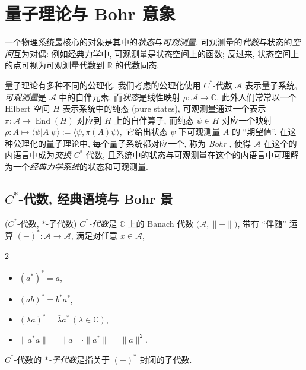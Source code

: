 \section{量子理论与 Bohr 意象}


一个物理系统最核心的对象是其中的\emph{状态}与\emph{可观测量}. 可观测量的\emph{代数}与状态的\emph{空间}互为对偶: 例如经典力学中, 可观测量是状态空间上的函数; 反过来, 状态空间上的点可视为可观测量代数到 $\mathbb{R}$ 的代数同态.

量子理论有多种不同的公理化, 我们考虑的公理化使用 $C^*$-代数 $\mathcal A$ 表示量子系统, \emph{可观测量}是 $\mathcal A$ 中的自伴元素, 而\emph{状态}是线性映射 $\rho\colon \mathcal A \to \mathbb{C}.$ 此外人们常常以一个 Hilbert 空间 $H$ 表示系统中的纯态 (pure states), 可观测量通过一个表示 $\pi\colon \mathcal A \to \operatorname{End}(H)$ 对应到 $H$ 上的自伴算子, 而纯态 $\psi\in H$ 对应一个映射
$
\rho\colon A\mapsto \langle\psi | A | \psi \rangle := \langle\psi,\pi(A)\psi\rangle,
$
它给出状态 $\psi$ 下可观测量 $A$ 的 ``期望值''.
在这种公理化的量子理论中, 每个量子系统都对应一个\topos{}, 称为 \emph{Bohr \topos{}}, 使得 $\mathcal A$ 在这个\topos{}的内语言中成为\emph{交换} $C^*$-代数, 且系统中的状态与可观测量在这个\topos{}的内语言中可理解为一个\emph{经典力学系统}的状态和可观测量.

\subsection{$C^*$-代数, 经典语境与 Bohr 景}

\begin{definition}
    {($C^*$-代数, $*$-子代数)}
    \emph{$C^*$-代数}是 $\mathbb{C}$ 上的 Banach 代数\footnotemark{} $\big(\mathcal A,\|{-}\|\big)$,
    带有 ``伴随'' 运算 $(-)^*\colon \mathcal A \to \mathcal A$,
    满足对任意 $x\in \mathcal A$,
    \begin{multicols}
    	{2}
    	\begin{itemize}
    		\item $(a^*)^*=a$,
    		\item $(ab)^*=b^*a^*$,
    		\item $(\lambda a)^*=\bar\lambda a^*\,(\lambda\in\mathbb{C})$,
    		\item $\|a^* a\|=\|a\|\cdot \|a^*\|=\|a\|^2$.
    	\end{itemize}
    \end{multicols}
    $C^*$-代数的 \emph{$*$-子代数}是指关于 $(-)^*$ 封闭的子代数.
\end{definition}

